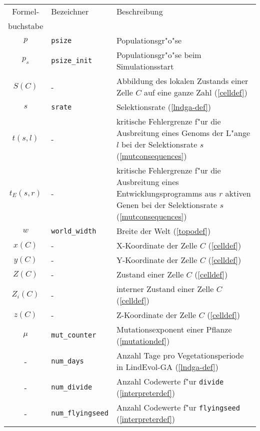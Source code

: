 \begin{appendix}
\noindent\begin{tabularx}{\linewidth}{|c|l|X|} \hline
Formel-      & Bezeichner               & Beschreibung \\
buchstabe    &                          & \\ \hline
$p$          & \verb|psize|             & Populationsgr"o"se \\
$p_s$        & \verb|psize_init|        & Populationsgr"o"se beim Simulationsstart \\
$S(C)$       & -                        & Abbildung des lokalen Zustands einer Zelle $C$ auf eine ganze Zahl (\ref{celldef}) \\
$s$          & \verb|srate|             & Selektionsrate (\ref{lndga-def}) \\
$t(s,l)$     & -                        & kritische Fehlergrenze f"ur die Ausbreitung eines Genoms der L"ange $l$
                                          bei der Selektionsrate $s$ (\ref{mutconsequences}) \\
$t_E(s,r)$   & -                        & kritische Fehlergrenze f"ur die Ausbreitung eines Entwicklungsprogramms aus $r$ aktiven Genen
                                          bei der Selektionsrate $s$ (\ref{mutconsequences}) \\
$w$          & \verb|world_width|       & Breite der Welt (\ref{topodef}) \\
$x(C)$       & -                        & X-Koordinate der Zelle $C$ (\ref{celldef}) \\
$y(C)$       & -                        & Y-Koordinate der Zelle $C$ (\ref{celldef}) \\
$Z(C)$       & -                        & Zustand einer Zelle $C$ (\ref{celldef}) \\
$Z_i(C)$     & -                        & interner Zustand einer Zelle $C$ (\ref{celldef}) \\
$z(C)$       & -                        & Z-Koordinate der Zelle $C$ (\ref{celldef}) \\
$\mu$        & \verb|mut_counter|       & Mutationsexponent einer Pflanze (\ref{mutationdef}) \\
-            & \verb|num_days|          & Anzahl Tage pro Vegetationsperiode in LindEvol-GA (\ref{lndga-def}) \\
-            & \verb|num_divide|        & Anzahl Codewerte f"ur \verb|divide| (\ref{interpreterdef}) \\
-            & \verb|num_flyingseed|    & Anzahl Codewerte f"ur \verb|flyingseed| (\ref{interpreterdef}) \\

\end{tabularx}
\end{appendix}
